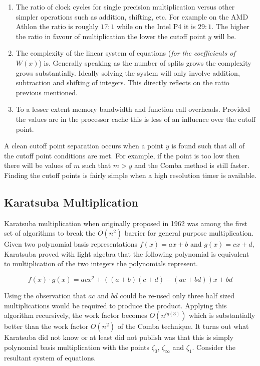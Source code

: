 \documentclass[b5paper]{book}
\begin{document}
\begin{enumerate}
\item  The ratio of clock cycles for single precision multiplication versus other simpler operations such as addition, shifting, etc.  For example
on the AMD Athlon the ratio is roughly $17 : 1$ while on the Intel P4 it is $29 : 1$.  The higher the ratio in favour of multiplication the lower
the cutoff point $y$ will be.  

\item  The complexity of the linear system of equations (\textit{for the coefficients of $W(x)$}) is.  Generally speaking as the number of splits
grows the complexity grows substantially.  Ideally solving the system will only involve addition, subtraction and shifting of integers.  This
directly reflects on the ratio previous mentioned.

\item  To a lesser extent memory bandwidth and function call overheads.  Provided the values are in the processor cache this is less of an
influence over the cutoff point.

\end{enumerate}

A clean cutoff point separation occurs when a point $y$ is found such that all of the cutoff point conditions are met.  For example, if the point
is too low then there will be values of $m$ such that $m > y$ and the Comba method is still faster.  Finding the cutoff points is fairly simple when
a high resolution timer is available.  

\subsection{Karatsuba Multiplication}
Karatsuba \cite{KARA} multiplication when originally proposed in 1962 was among the first set of algorithms to break the $O(n^2)$ barrier for
general purpose multiplication.  Given two polynomial basis representations $f(x) = ax + b$ and $g(x) = cx + d$, Karatsuba proved with 
light algebra \cite{KARAP} that the following polynomial is equivalent to multiplication of the two integers the polynomials represent.

\begin{equation}
f(x) \cdot g(x) = acx^2 + ((a + b)(c + d) - (ac + bd))x + bd
\end{equation}

Using the observation that $ac$ and $bd$ could be re-used only three half sized multiplications would be required to produce the product.  Applying
this algorithm recursively, the work factor becomes $O(n^{lg(3)})$ which is substantially better than the work factor $O(n^2)$ of the Comba technique.  It turns 
out what Karatsuba did not know or at least did not publish was that this is simply polynomial basis multiplication with the points 
$\zeta_0$, $\zeta_{\infty}$ and $\zeta_{1}$.  Consider the resultant system of equations.
\end{document}
